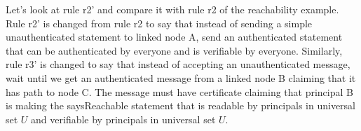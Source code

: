 Let's look at rule r2' and compare it with rule r2 of the reachability example. Rule r2' is changed from rule r2 to say that instead of sending a simple unauthenticated statement to linked node A, send an authenticated statement that can be authenticated by everyone and is verifiable by everyone. Similarly, rule r3' is changed to say that instead of accepting an unauthenticated message, wait until we get an authenticated message from a linked node B claiming that it has path to node C. The message must have certificate claiming that principal B is making the saysReachable statement that is readable by principals in universal set $U$ and verifiable by principals in universal set $U$.